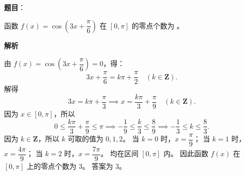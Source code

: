 \begin{answer}

\textbf{题目}：

函数 $f(x) = \cos\left(3x + \dfrac\pi6\right)$ 在 $[0, \pi]$ 的零点个数为 \underline{\hspace{2cm}}。

\textbf{解析}

由 $f(x) = \cos\left(3x + \dfrac\pi6\right) = 0$，得：
\nopagebreak[4]
\[3x + \dfrac\pi6 = k\pi + \dfrac\pi2 \quad (k \in \mathbf{Z}).\]
解得
\nopagebreak[4]
\[3x = k\pi + \dfrac\pi3 \implies x = \dfrac{k\pi}{3} + \dfrac\pi9 \quad (k \in \mathbf{Z}).\]
因为 $x \in [0, \pi]$，所以
\nopagebreak[4]
\[0 \leqslant \dfrac{k\pi}{3} + \dfrac\pi9 \leqslant \pi \implies -\dfrac19 \leqslant \dfrac{k}{3} \leqslant \dfrac89 \implies -\dfrac13 \leqslant k \leqslant \dfrac83.\]
因为 $k \in \mathbf{Z}$，所以 $k$ 可取的值为 $0, 1, 2$。
当 $k = 0$ 时，$x = \dfrac\pi9$；
当 $k = 1$ 时，$x = \dfrac{4\pi}{9}$；
当 $k = 2$ 时，$x = \dfrac{7\pi}{9}$。
均在区间 $[0, \pi]$ 内。
因此函数 $f(x)$ 在 $[0, \pi]$ 上的零点个数为 $3$。
答案为 $3$。


\end{answer}
